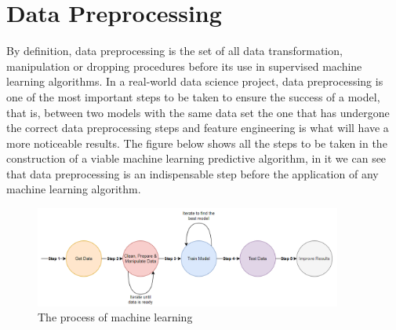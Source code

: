 

\chapter{Data Preprocessing}
\label{cha:data_preprocessing}
\hspace{10px}By definition, data preprocessing is the set of all data transformation, manipulation or dropping procedures before its use in supervised machine learning algorithms. In a real-world data science project, data preprocessing is one of the most important steps to be taken to ensure the success of a model, that is, between two models with the same data set the one that has undergone the correct data preprocessing steps and feature engineering is what will have a more noticeable results. The figure below shows all the steps to be taken in the construction of a viable machine learning predictive algorithm, in it we can see that data preprocessing is an indispensable step before the application of any machine learning algorithm.

\begin{figure}[h]
    \centering
    \includegraphics[width=0.9\textwidth,height=0.2\textheight]{Chapters/Figures/data preprocessing.png}
    \caption{The process of machine learning}
    \label{fig:preprocessing}
\end{figure}


